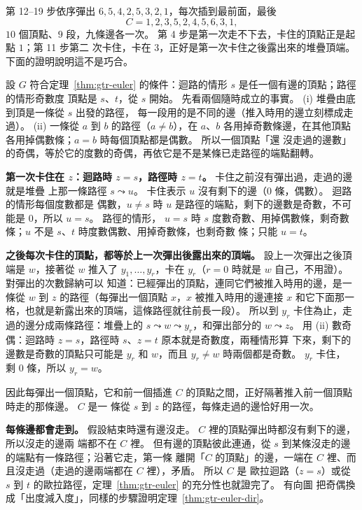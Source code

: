 第 12--19 步依序彈出 $6, 5, 4, 2, 5, 3, 2, 1$，每次插到最前面，最後
\[
C = 1, 2, 3, 5, 2, 4, 5, 6, 3, 1,
\]
$10$ 個頂點、$9$ 段，九條邊各一次。 第 4 步是第一次走不下去，卡住的頂點正是起點 $1$；第 11 步第二
次卡住，卡在 $3$，正好是第一次卡住之後露出來的堆疊頂端。 下面的證明說明這不是巧合。

\begin{whybox}
設 $G$ 符合定理~\ref{thm:gtr-euler} 的條件：迴路的情形 $s$ 是任一個有邊的頂點；路徑的情形奇數度
頂點是 $s$、$t$，從 $s$ 開始。 先看兩個隨時成立的事實。 (i) 堆疊由底到頂是一條從 $s$ 出發的路徑，
每一段用的是不同的邊（推入時用的邊立刻標成走過）。 (ii) 一條從 $a$ 到 $b$ 的路徑（$a \ne b$），在
$a$、$b$ 各用掉奇數條邊，在其他頂點各用掉偶數條；$a = b$ 時每個頂點都是偶數。 所以一個頂點「還
沒走過的邊數」的奇偶，等於它的度數的奇偶，再依它是不是某條已走路徑的端點翻轉。

\textbf{第一次卡住在 $z$：迴路時 $z = s$，路徑時 $z = t$。} 卡住之前沒有彈出過，走過的邊就是堆疊
上那一條路徑 $s \leadsto u$。 卡住表示 $u$ 沒有剩下的邊（$0$ 條，偶數）。 迴路的情形每個度數都是
偶數，$u \ne s$ 時 $u$ 是路徑的端點，剩下的邊數是奇數，不可能是 $0$，所以 $u = s$。 路徑的情形，
$u = s$ 時 $s$ 度數奇數、用掉偶數條，剩奇數條；$u$ 不是 $s$、$t$ 時度數偶數、用掉奇數條，也剩奇數
條；只能 $u = t$。

\textbf{之後每次卡住的頂點，都等於上一次彈出後露出來的頂端。} 設上一次彈出之後頂端是 $w$，接著從
$w$ 推入了 $y_1, \ldots, y_r$，卡在 $y_r$（$r = 0$ 時就是 $w$ 自己，不用證）。 對彈出的次數歸納可以
知道：已經彈出的頂點，連同它們被推入時用的邊，是一條從 $w$ 到 $z$ 的路徑（每彈出一個頂點 $x$，$x$
被推入時用的邊連接 $x$ 和它下面那一格，也就是新露出來的頂端，這條路徑就往前長一段）。 所以到
$y_r$ 卡住為止，走過的邊分成兩條路徑：堆疊上的 $s \leadsto w \leadsto y_r$，和彈出部分的
$w \leadsto z$。 用 (ii) 數奇偶：迴路時 $z = s$，路徑時 $s$、$z = t$ 原本就是奇數度，兩種情形算
下來，剩下的邊數是奇數的頂點只可能是 $y_r$ 和 $w$，而且 $y_r \ne w$ 時兩個都是奇數。 $y_r$ 卡住，
剩 $0$ 條，所以 $y_r = w$。

因此每彈出一個頂點，它和前一個插進 $C$ 的頂點之間，正好隔著推入前一個頂點時走的那條邊。 $C$ 是一
條從 $s$ 到 $z$ 的路徑，每條走過的邊恰好用一次。

\textbf{每條邊都會走到。} 假設結束時還有邊沒走。 $C$ 裡的頂點彈出時都沒有剩下的邊，所以沒走的邊兩
端都不在 $C$ 裡。 但有邊的頂點彼此連通，從 $s$ 到某條沒走的邊的端點有一條路徑；沿著它走，第一條
離開「$C$ 的頂點」的邊，一端在 $C$ 裡、而且沒走過（走過的邊兩端都在 $C$ 裡），矛盾。 所以 $C$ 是
歐拉迴路（$z = s$）或從 $s$ 到 $t$ 的歐拉路徑，定理~\ref{thm:gtr-euler} 的充分性也就證完了。 有向圖
把奇偶換成「出度減入度」，同樣的步驟證明定理~\ref{thm:gtr-euler-dir}。
\end{whybox}

